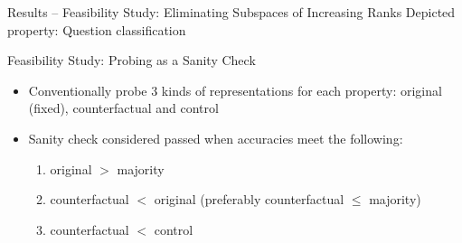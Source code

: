 \documentclass[aspectratio=169]{beamer}
\begin{document}
\begin{frame}{Results -- Feasibility Study: Eliminating Subspaces of Increasing Ranks}
    Depicted property: Question classification
    \begin{figure}[!ht]
        \centering
    \end{figure}
\end{frame}
% 

\begin{frame}{Feasibility Study: Probing as a Sanity Check}
    \begin{itemize}
        \item Conventionally probe 3 kinds of representations for each property: original (fixed), counterfactual and control
        \item Sanity check considered passed when accuracies meet the following:
              \begin{enumerate}
                  \item original $>$ majority
                  \item counterfactual $<$ original (preferably counterfactual $\le$ majority)
                  \item counterfactual $<$ control
              \end{enumerate}
    \end{itemize}
\end{frame}
\end{document}
